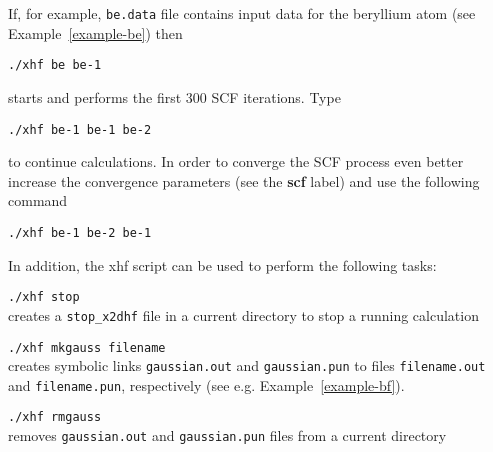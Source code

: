 \documentclass[12pt,a4paper]{article}
\begin{document}
If, for example, \texttt{be.data} file contains input data for
the beryllium atom (see Example~\ref{example-be}) then
\begin{description}
\item \hspace*{0.5cm} \texttt{./xhf be be-1}
\end{description}
starts and performs the first 300 SCF iterations. Type
\begin{description}
\item \hspace*{0.5cm} \texttt{./xhf be-1 be-1 be-2}
\end{description}
to continue calculations. In order to converge the SCF process
even better increase the convergence parameters (see the \textbf{scf}
label) and use the following
command
\begin{description}
\item \hspace*{0.5cm} \texttt{./xhf be-1 be-2 be-1}
\end{description}



In addition, the xhf script can be used to perform the following
tasks:

\begin{description}
\item \hspace*{0.5cm} \texttt{./xhf stop}\\ creates a
  \texttt{stop\_x2dhf} file in a current directory to stop a running
  calculation %
\end{description}

\begin{description}
\item \hspace*{0.5cm} \texttt{./xhf mkgauss filename}\\ creates
  symbolic links \texttt{gaussian.out} and \texttt{gaussian.pun} to
  files \texttt{filename.\-out} and \texttt{filename.pun},
  respectively (see e.g. Example~\ref{example-bf}).
\end{description}

\begin{description}
\item \hspace*{0.5cm} \texttt{./xhf rmgauss}\\ removes
  \texttt{gaussian.out} and \texttt{gaussian.pun} files from a current
  directory
\end{description}
\end{document}
